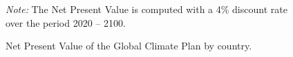 \documentclass[12pt,english]{article}
\begin{document}
\begin{figure}[b!]
  \caption{Net Present Value of the Global Climate Plan by country.}\label{fig:median_gain_adj}
  {\footnotesize \textit{Note:} The Net Present Value is computed with a 4\% discount rate over the period 2020 -- 2100.}
\end{figure}
\end{document}
